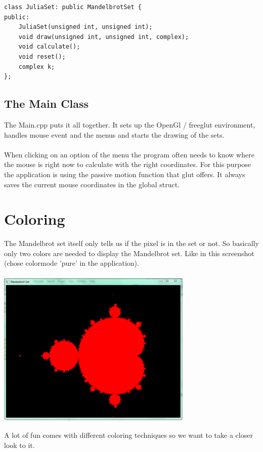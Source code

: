 \documentclass[final, paper=a4, paper=portrait, pagesize=auto, fontsize=10pt,english]{scrartcl}
\begin{document}
\begin{lstlisting}
class JuliaSet: public MandelbrotSet {
public:
	JuliaSet(unsigned int, unsigned int);
	void draw(unsigned int, unsigned int, complex);
	void calculate();
	void reset();
	complex k;
};
\end{lstlisting}

\subsection{The Main Class} 	
The Main.cpp puts it all together. It sets up the OpenGl / freeglut environment, handles mouse event and the menus and starts the drawing of the sets. \\\\
When clicking on an option of the menu the program often needs to know where the mouse is right now to calculate with the right coordinates. For this purpose the application is using the passive motion function that glut offers. It always saves the current mouse coordinates in the global struct.

\section{Coloring}
The Mandelbrot set itself only tells us if the pixel is in the set or not. So basically only two colors are needed to display the Mandelbrot set. Like in this screenshot (chose colormode 'pure' in the application). \\\\
\includegraphics[width=0.7\textwidth]{screeniePure}

A lot of fun comes with different coloring techniques so we want to take a closer look to it.
\end{document}
